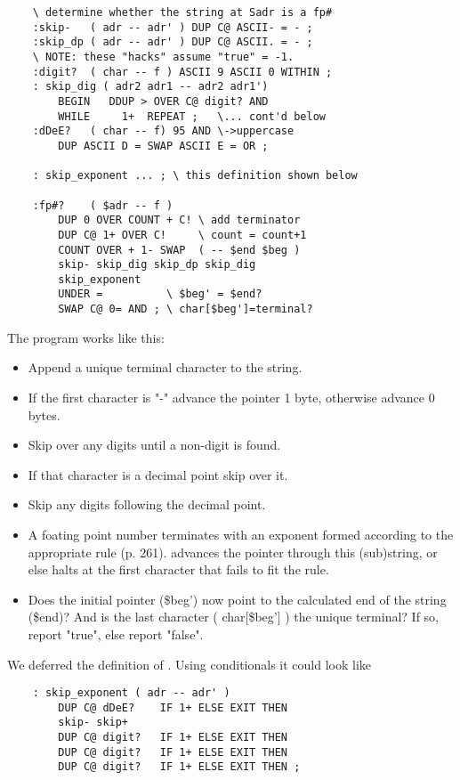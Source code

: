 \begin{lstlisting}
    \ determine whether the string at Sadr is a fp#
    :skip-   ( adr -- adr' ) DUP C@ ASCII- = - ;
    :skip_dp ( adr -- adr' ) DUP C@ ASCII. = - ;
    \ NOTE: these "hacks" assume "true" = -1.
    :digit?  ( char -- f ) ASCII 9 ASCII 0 WITHIN ;
    : skip_dig ( adr2 adr1 -- adr2 adr1')
        BEGIN   DDUP > OVER C@ digit? AND
        WHILE     1+  REPEAT ;   \... cont'd below
    :dDeE?   ( char -- f) 95 AND \->uppercase
        DUP ASCII D = SWAP ASCII E = OR ;

    : skip_exponent ... ; \ this definition shown below

    :fp#?    ( $adr -- f )
        DUP 0 OVER COUNT + C! \ add terminator
        DUP C@ 1+ OVER C!     \ count = count+1
        COUNT OVER + 1- SWAP  ( -- $end $beg )
        skip- skip_dig skip_dp skip_dig
        skip_exponent
        UNDER =          \ $beg' = $end?
        SWAP C@ 0= AND ; \ char[$beg']=terminal?
\end{lstlisting}

The program works like this:

\begin{itemize}
    \item Append a unique terminal character to the string.
    \item If the first character is "-" advance the pointer 1 byte, otherwise advance 0 bytes.
    \item Skip over any digits until a non-digit is found.
    \item If that character is a decimal point skip over it.
    \item Skip any digits following the decimal point.
    \item A foating point number terminates with an exponent formed according to the appropriate rule (p. 261).  advances the pointer through this (sub)string, or else halts at the first character that fails to fit the rule.
    \item Does the initial pointer (\$beg') now point to the calculated end of the string (\$end)? And is the last character ( char[\$beg'] ) the unique terminal? If so, report "true", else report "false".
\end{itemize}

We deferred the definition of . Using conditionals it could look like

\begin{lstlisting}
    : skip_exponent ( adr -- adr' )
        DUP C@ dDeE?    IF 1+ ELSE EXIT THEN
        skip- skip+
        DUP C@ digit?   IF 1+ ELSE EXIT THEN
        DUP C@ digit?   IF 1+ ELSE EXIT THEN
        DUP C@ digit?   IF 1+ ELSE EXIT THEN ;
\end{lstlisting}

